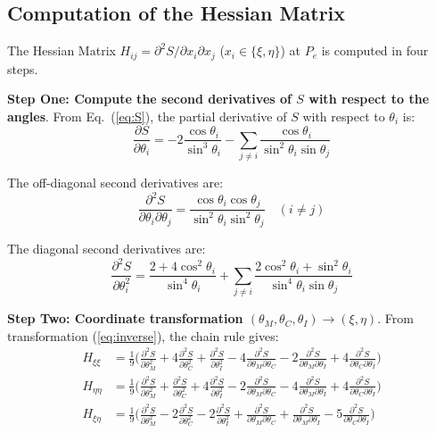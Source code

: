 \documentclass[aps,prd,reprint,nofootinbib]{revtex4-2}
\begin{document}
\subsection{Computation of the Hessian Matrix}

The Hessian Matrix $H_{ij} = \partial^2 S/\partial x_i \partial x_j$ ($x_i \in \{\xi, \eta\}$) at $P_e$ is computed in four steps.

\textbf{Step One: Compute the second derivatives of $S$ with respect to the angles}. From Eq.~(\ref{eq:S}), the partial derivative of $S$ with respect to $\theta_i$ is:
\begin{equation}
\frac{\partial S}{\partial \theta_i} = -2\frac{\cos\theta_i}{\sin^3\theta_i} - \sum_{j \neq i} \frac{\cos\theta_i}{\sin^2\theta_i \sin\theta_j}
\end{equation}

The off-diagonal second derivatives are:
\begin{equation}
\frac{\partial^2 S}{\partial \theta_i \partial \theta_j} = \frac{\cos\theta_i \cos\theta_j}{\sin^2\theta_i \sin^2\theta_j} \quad (i \neq j)
\end{equation}

The diagonal second derivatives are:
\begin{equation}
\frac{\partial^2 S}{\partial \theta_i^2} = \frac{2 + 4\cos^2\theta_i}{\sin^4\theta_i} + \sum_{j \neq i} \frac{2\cos^2\theta_i + \sin^2\theta_i}{\sin^4\theta_i \sin\theta_j}
\end{equation}

\textbf{Step Two: Coordinate transformation $(\theta_M, \theta_C, \theta_I) \to (\xi, \eta)$}. From transformation (\ref{eq:inverse}), the chain rule gives:
\begin{align}
H_{\xi\xi} &= \frac{1}{9}\Big(\frac{\partial^2 S}{\partial\theta_M^2} + 4\frac{\partial^2 S}{\partial\theta_C^2} + \frac{\partial^2 S}{\partial\theta_I^2} - 4\frac{\partial^2 S}{\partial\theta_M\partial\theta_C} - 2\frac{\partial^2 S}{\partial\theta_M\partial\theta_I} + 4\frac{\partial^2 S}{\partial\theta_C\partial\theta_I}\Big) \\
H_{\eta\eta} &= \frac{1}{9}\Big(\frac{\partial^2 S}{\partial\theta_M^2} + \frac{\partial^2 S}{\partial\theta_C^2} + 4\frac{\partial^2 S}{\partial\theta_I^2} - 2\frac{\partial^2 S}{\partial\theta_M\partial\theta_C} - 4\frac{\partial^2 S}{\partial\theta_M\partial\theta_I} + 4\frac{\partial^2 S}{\partial\theta_C\partial\theta_I}\Big) \\
H_{\xi\eta} &= \frac{1}{9}\Big(\frac{\partial^2 S}{\partial\theta_M^2} - 2\frac{\partial^2 S}{\partial\theta_C^2} - 2\frac{\partial^2 S}{\partial\theta_I^2} + \frac{\partial^2 S}{\partial\theta_M\partial\theta_C} + \frac{\partial^2 S}{\partial\theta_M\partial\theta_I} - 5\frac{\partial^2 S}{\partial\theta_C\partial\theta_I}\Big)
\end{align}
\end{document}
